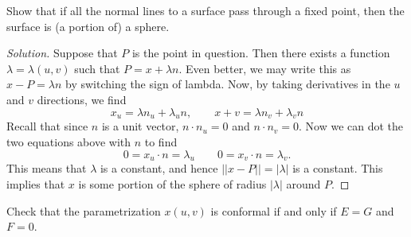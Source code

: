 \documentclass[Shifrin_Solutions_Spring_2015]{subfiles}
\begin{document}
\begin{exercise}
Show that if all the normal lines to a surface pass through a fixed point, then the surface is (a portion of) a sphere.
\end{exercise}

\begin{proof}[Solution] Suppose that $P$ is the point in question. Then there exists a function $\lambda=\lambda(u,v)$ such that $P = x + \lambda n$. Even better, we may write this as $x-P = \lambda n$ by switching the sign of lambda. Now, by taking derivatives in the $u$ and $v$ directions, we find
\[
x_u = \lambda n_u + \lambda_u n, \qquad x+v = \lambda n_v + \lambda_v n
\]
Recall that since $n$ is a unit vector, $n\cdot n_u =0$ and $n\cdot n_v = 0$. Now we can dot the two equations above with $n$ to find
\[
0 = x_u \cdot n = \lambda_u \qquad 0 = x_v \cdot n = \lambda_v.
\]
This means that $\lambda$ is a constant, and hence $||x-P|| = |\lambda|$ is a constant. This implies that $x$ is some portion of the sphere of radius $|\lambda|$ around $P$.
\end{proof}

\begin{exercise}
Check that the parametrization $x(u,v)$ is conformal if and only if $E=G$ and $F=0$.
\end{exercise}
\end{document}
